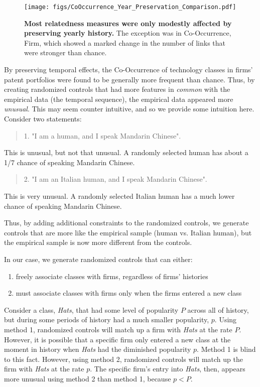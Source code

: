 \documentclass[pre,reprint,groupedaddress,superscriptaddress]{revtex4-1}
\begin{document}
\begin{figure}[]
\centering
\texttt{[image: figs/CoOccurrence\_Year\_Preservation\_Comparison.pdf]} 
\caption{\textbf{Most relatedness measures were only modestly affected by preserving yearly history.} The exception was in Co-Occurrence, Firm, which showed a marked change in the number of links that were stronger than chance.}\label{CoOccurrence_Year_Preservation_Comparison}
\end{figure}

By preserving temporal effects, the Co-Occurrence of technology classes in firms' patent portfolios were found to be generally more frequent than chance. Thus, by creating randomized controls that had more features in \textit{common} with the empirical data (the temporal sequence), the empirical data appeared more \textit{unusual}. This may seem counter intuitive, and so we provide some intuition here. Consider two statements:
\begin{quote}
1. "I am a human, and I speak Mandarin Chinese". 
\end{quote}
This is unusual, but not that unusual. A randomly selected human has about a 1/7 chance of speaking Mandarin Chinese.

\begin{quote}
2. "I am an Italian human, and I speak Mandarin Chinese".
\end{quote}
This is very unusual. A randomly selected Italian human has a much lower chance of speaking Mandarin Chinese.

Thus, by adding additional constraints to the randomized controls, we generate controls that are more like the empirical sample (human vs. Italian human), but the empirical sample is now more different from the controls.

In our case, we generate randomized controls that can either:
\begin{enumerate}
\item freely associate classes with firms, regardless of firms' histories
\item must associate classes with firms only when the firms entered a new class
\end{enumerate}

Consider a class, \textit{Hats}, that had some level of popularity $P$ across all of history, but during some periods of history had a much smaller popularity, $p$. Using method 1, randomized controls will match up a firm with \textit{Hats} at the rate $P$. However, it is possible that a specific firm only entered a new class at the moment in history when \textit{Hats} had the diminished popularity $p$.  Method 1 is blind to this fact. However, using method 2, randomized controls will match up the firm with \textit{Hats} at the rate $p$. The specific firm's entry into \textit{Hats}, then, appears more unusual using method 2 than method 1, because $p<P$. 
\end{document}

